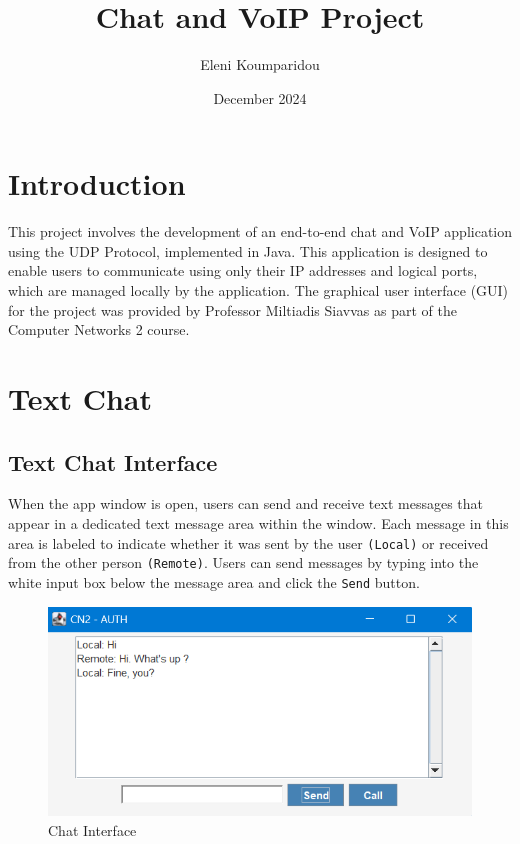 \documentclass{article}
\title{Chat and VoIP Project}
\author{Eleni Koumparidou}
\date{December 2024}
\begin{document}
\maketitle
\tableofcontents


\newpage
\section{Introduction}
This project involves the development of an end-to-end chat and VoIP application using the UDP Protocol, implemented in Java. This application is designed to enable users to communicate using only their IP addresses and logical ports, which are managed locally by the application.
The graphical user interface (GUI) for the project was provided by Professor Miltiadis Siavvas as part of the Computer Networks 2 course.

\section{Text Chat}
\subsection{Text Chat Interface}
When the app window is open, users can send and receive text messages that appear in a dedicated text message area within the window. Each message in this area is labeled to indicate whether it was sent by the user \texttt{(Local)} or received from the other person \texttt{(Remote)}. Users can send messages by typing into the white input box below the message area and click the \texttt{Send} button. 

\begin{figure}[h!]
    \centering
    \includegraphics[width=1\linewidth]{image1.png}
    \caption{Chat Interface}
    \label{fig:enter-label}
\end{figure}
\end{document}
